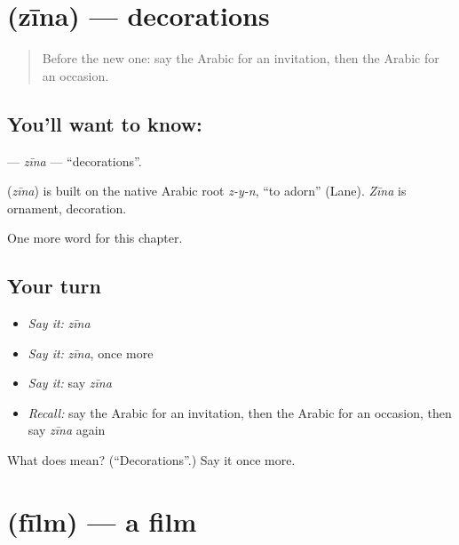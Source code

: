 \section[\texorpdfstring{\ar{زينة} (zīna)}{زينة (zīna)}]{ (zīna) — decorations}

\label{lesson:AR-C184-zina}



\begin{quote}
Before the new one: say the Arabic for an invitation, then the Arabic for an occasion.
\end{quote}

\subsection*{You'll want to know: }
\textbf{} — \emph{zīna} — \textquotedblleft{}decorations\textquotedblright{}.

\begin{cousinweb}
\textbf{} (\emph{zīna}) is built on the native Arabic root \emph{z-y-n}, \textquotedblleft{}to adorn\textquotedblright{} (Lane). \emph{Zīna} is ornament, decoration.
\end{cousinweb}

\begin{grammarlens}[title={What you've built}]
One more word for this chapter.
\end{grammarlens}

\subsection*{Your turn}
\begin{itemize}
\raggedright
  \item \emph{Say it:} \emph{zīna}
  \item \emph{Say it:} \emph{zīna}, once more
  \item \emph{Say it:} say \emph{zīna}
  \item \emph{Recall:} say the Arabic for an invitation, then the Arabic for an occasion, then say \emph{zīna} again
\end{itemize}

\begin{tcolorbox}[breakable,colback=teal!4,colframe=teal!35!black,title={Before you move on}]
What does  mean? (\textquotedblleft{}Decorations\textquotedblright{}.) Say it once more.
\end{tcolorbox}
\section[\texorpdfstring{\ar{فيلم} (fīlm)}{فيلم (fīlm)}]{ (fīlm) — a film}

